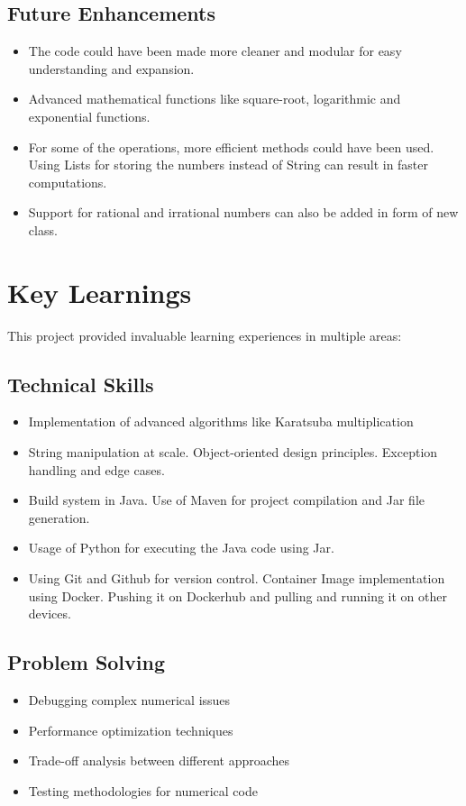 \documentclass{article}
\begin{document}
\subsection{Future Enhancements}
\begin{itemize}
    \item The code could have been made more cleaner and modular for easy understanding and expansion.
    \item Advanced mathematical functions like square-root, logarithmic and exponential functions.
    \item For some of the operations, more efficient methods could have been used. Using Lists for storing the numbers instead of String can result in faster computations.
    \item Support for rational and irrational numbers can also be added in form of new class.
\end{itemize}

\section{Key Learnings}
This project provided invaluable learning experiences in multiple areas:

\subsection{Technical Skills}
\begin{itemize}
    \item Implementation of advanced algorithms like Karatsuba multiplication
    \item String manipulation at scale. Object-oriented design principles. Exception handling and edge cases.
    \item Build system in Java. Use of Maven for project compilation and Jar file generation.
    \item Usage of Python for executing the Java code using Jar.
    \item Using Git and Github for version control.
    \Item Container Image implementation using Docker. Pushing it on Dockerhub and pulling and running it on other devices.
\end{itemize}

\subsection{Problem Solving}
\begin{itemize}
    \item Debugging complex numerical issues
    \item Performance optimization techniques
    \item Trade-off analysis between different approaches
    \item Testing methodologies for numerical code
\end{itemize}
\end{document}
